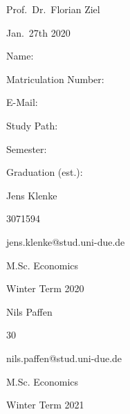 \documentclass[12pt,a4paper]{article}
\begin{document}
\begin{titlepage}
  \noindent\begin{minipage}[t]{0.3\textwidth}
  \end{minipage}
  \begin{minipage}[t]{0.7\textwidth}
  \hspace{1cm}Prof.~Dr.~Florian Ziel
  \end{minipage}

  \noindent\begin{minipage}[t]{0.3\textwidth}
  \end{minipage}
  \begin{minipage}[t]{0.7\textwidth}
  \hspace{1cm}Jan.~27th 2020
  \end{minipage}

  \hrulefill

  \begin{multicols}{3}

  Name:

  Matriculation Number:

  E-Mail:

  Study Path:

  Semester:

  Graduation (est.):
 
  \columnbreak

  Jens Klenke

  3071594
  
  jens.klenke@stud.uni-due.de

  M.Sc. Economics


  Winter Term 2020
  
  \columnbreak

  Nils Paffen

  30
  
  nils.paffen@stud.uni-due.de

  M.Sc. Economics


  Winter Term 2021

	\end{multicols}

\end{titlepage}



{
\hypersetup{linkcolor=black}

\setcounter{tocdepth}{3}
\tableofcontents
}
\end{document}

